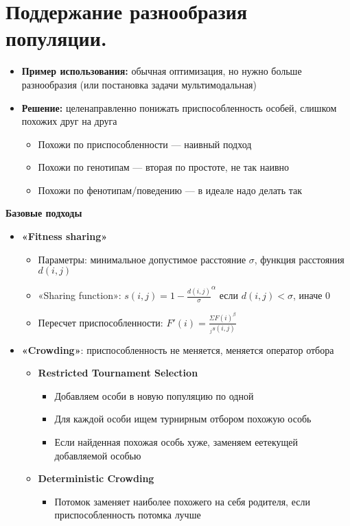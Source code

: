 \section{Поддержание разнообразия популяции.}

\begin{itemize}
    \item \textbf{Пример использования:} обычная оптимизация, но нужно больше разнообразия (или постановка задачи мультимодальная)
    \item \textbf{Решение:} целенаправленно понижать приспособленность особей, слишком похожих друг на друга
    \begin{itemize}
        \item Похожи по приспособленности — наивный подход 
        \item Похожи по генотипам — вторая по простоте, не так наивно
        \item Похожи по фенотипам/поведению — в идеале надо делать так
    \end{itemize}
\end{itemize}

\textbf{Базовые подходы}
\begin{itemize}
    \item \textbf{«Fitness sharing»}
    \begin{itemize}
        \item Параметры: минимальное допустимое расстояние $\sigma$, функция расстояния $d(i, j)$
        \item«Sharing function»: $s(i,j) = 1 - \frac{d(i,j)}{\sigma}^\alpha$ если $d(i,j)< \sigma$, иначе 0
        \item Пересчет приспособленности: $F'(i) = \frac{\Sigma F(i)^\beta}{_js(i,j)}$
    \end{itemize}
    \item \textbf{«Crowding»}: приспособленность не меняется, меняется оператор отбора 
    \begin{itemize}
        \item \textbf{Restricted Tournament Selection}
        \begin{itemize}
            \item Добавляем особи в новую популяцию по одной
            \item Для каждой особи ищем турнирным отбором похожую особь
            \item Если найденная похожая особь хуже, заменяем еетекущей добавляемой особью
        \end{itemize}
        \item \textbf{Deterministic Crowding}
        \begin{itemize}
            \item Потомок заменяет наиболее похожего на себя родителя, если приспособленность потомка лучше    
        \end{itemize}
    \end{itemize}
\end{itemize}


